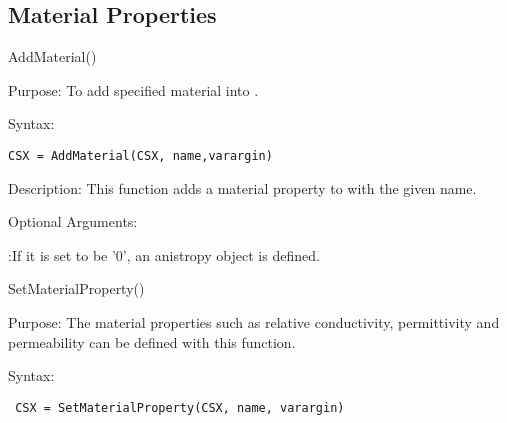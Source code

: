 \subsection{Material Properties}\label{subsection_material_prop}

\begin{FontNameFunct}{AddMaterial()}
\end{FontNameFunct}

\begin{FontDescr}{Purpose:}
 To add specified material into \hyperref[CSX]{}.
\end{FontDescr}

\begin{FontDescr}{Syntax:}
 \begin{lstlisting}
CSX = AddMaterial(CSX, name,varargin)
 \end{lstlisting}
\end{FontDescr}

\begin{FontDescr}{Description:}
  This function adds a material property to \hyperref[CSX]{} with the given name.
\end{FontDescr}
\begin{FontDescr}{Optional Arguments:}
\begin{myindentpar} 
   :If it is set to be '0', an anistropy object is defined. 
\end{myindentpar}  
\end{FontDescr}

\begin{FontNameFunct}{SetMaterialProperty()}
 \end{FontNameFunct}
 
\begin{FontDescr}{Purpose:}
The material properties such as relative conductivity, permittivity and permeability can be defined with this function.
\end{FontDescr}

 \begin{FontDescr}{Syntax:}
  \begin{lstlisting}
 CSX = SetMaterialProperty(CSX, name, varargin)
  \end{lstlisting}
 \end{FontDescr}
  
